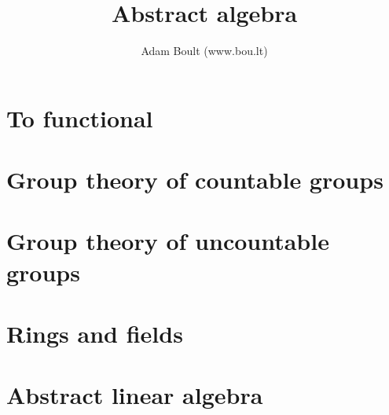 \documentclass[oneside]{book}
\begin{document}
\author{Adam Boult (www.bou.lt)}
\title{Abstract algebra}
\maketitle

\setcounter{tocdepth}{0}
\tableofcontents



\part{To functional}



\part{Group theory of countable groups}









\part{Group theory of uncountable groups}



\part{Rings and fields}



\part{Abstract linear algebra}







\end{document}
